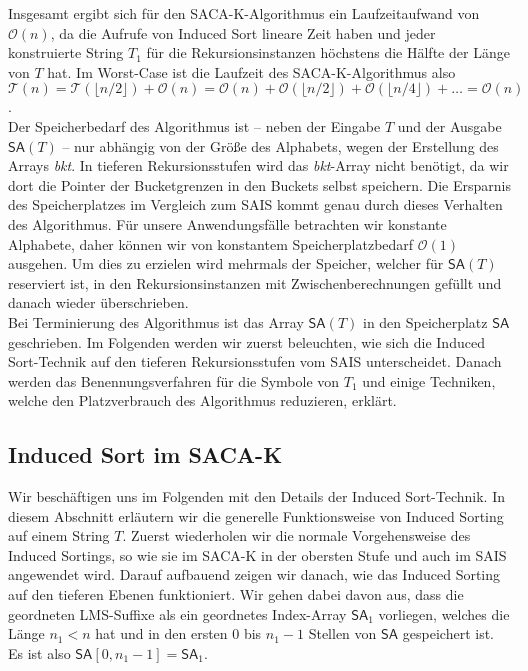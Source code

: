 Insgesamt ergibt sich für den SACA-K-Algorithmus ein Laufzeitaufwand von $\mathcal O(n)$, da die Aufrufe von Induced Sort lineare Zeit haben und jeder konstruierte String $T_1$ für die Rekursionsinstanzen höchstens die Hälfte der Länge von $T$ hat. Im Worst-Case ist die Laufzeit des SACA-K-Algorithmus also $\mathcal T(n) = \mathcal T(\lfloor n/2 \rfloor) + \mathcal O(n) = \mathcal O(n) + \mathcal O(\lfloor n/2 \rfloor) + \mathcal O(\lfloor n/4 \rfloor) + \ldots = \mathcal O(n)$. \\
Der Speicherbedarf des Algorithmus ist -- neben der Eingabe $T$ und der Ausgabe $\mathsf{SA}(T)$ -- nur abhängig von der Größe des Alphabets, wegen der Erstellung des Arrays \textit{bkt}. In tieferen Rekursionsstufen wird das \textit{bkt}-Array nicht benötigt, da wir dort die Pointer der Bucketgrenzen in den Buckets selbst speichern. Die Ersparnis des Speicherplatzes im Vergleich zum SAIS kommt genau durch dieses Verhalten des Algorithmus. Für unsere Anwendungsfälle betrachten wir konstante Alphabete, daher können wir von konstantem Speicherplatzbedarf $\mathcal O(1)$ ausgehen. Um dies zu erzielen wird mehrmals der Speicher, welcher für $\mathsf{SA}(T)$ reserviert ist, in den Rekursionsinstanzen mit Zwischenberechnungen gefüllt und danach wieder überschrieben.  \\

Bei Terminierung des Algorithmus ist das Array $\mathsf{SA}(T)$ in den Speicherplatz $\mathsf{SA}$ geschrieben. Im Folgenden werden wir zuerst beleuchten, wie sich die Induced Sort-Technik auf den tieferen Rekursionsstufen vom SAIS unterscheidet. Danach werden das Benennungsverfahren für die Symbole von $T_1$ und einige Techniken, welche den Platzverbrauch des Algorithmus reduzieren, erklärt.

\subsection{Induced Sort im SACA-K}

Wir beschäftigen uns im Folgenden mit den Details der Induced Sort-Technik. In diesem Abschnitt erläutern wir die generelle Funktionsweise von Induced Sorting auf einem String $T$. Zuerst wiederholen wir die normale Vorgehensweise des Induced Sortings, so wie sie im SACA-K in der obersten Stufe und auch im SAIS angewendet wird. Darauf aufbauend zeigen wir danach, wie das Induced Sorting auf den tieferen Ebenen funktioniert. Wir gehen dabei davon aus, dass die geordneten LMS-Suffixe als ein geordnetes Index-Array $\mathsf{SA}_1$ vorliegen, welches die Länge $n_1 < n$ hat und in den ersten $0$ bis $n_1-1$ Stellen von $\mathsf{SA}$ gespeichert ist. Es ist also $\mathsf{SA}[0,n_1-1] = \mathsf{SA}_1$. \pagebreak

